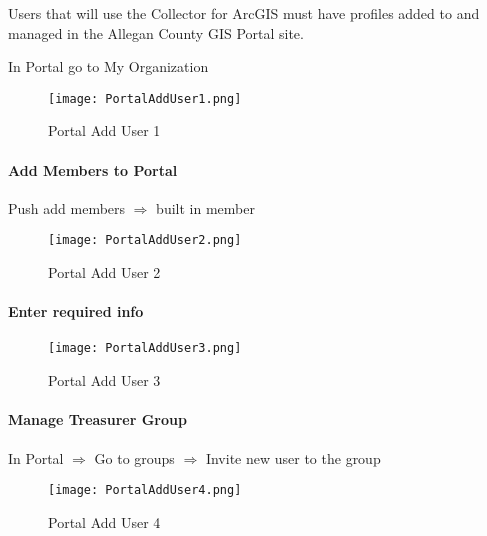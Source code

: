 \noindent Users that will use the Collector for ArcGIS must have profiles added to and managed in the Allegan County GIS Portal site.
\vspace{.5in}

In Portal go to My Organization
\begin{figure}[h!]
\centering
    \texttt{[image: PortalAddUser1.png]}
\caption{Portal Add User 1}
\end{figure}
\clearpage
\paragraph[Add Members to Portal]{\Large Add Members to Portal\texorpdfstring{\\}{}}
\vspace{.5in}

Push add members $\Rightarrow$ built in member
\vspace{.5in}

\begin{figure}[h!]
\centering
    \texttt{[image: PortalAddUser2.png]}
\caption{Portal Add User 2}
\end{figure}
\clearpage
\paragraph[Enter required info]{\Large Enter required info\texorpdfstring{\\}{}}
\vspace{.5in}

\begin{figure}[h!]
\centering
    \texttt{[image: PortalAddUser3.png]}
\caption{Portal Add User 3}
\end{figure}
\clearpage
\paragraph[Manage Treasurer Group]{\Large Manage Treasurer Group\texorpdfstring{\\}{}}
\vspace{.5in}

In Portal $\Rightarrow$ Go to groups $\Rightarrow$ Invite new user to the group
\vspace{.5in}

\begin{figure}[h!]
\centering
    \texttt{[image: PortalAddUser4.png]}
\caption{Portal Add User 4}
\end{figure}
\clearpage
